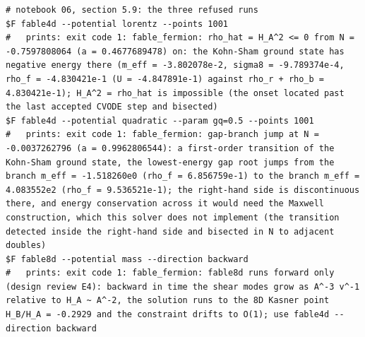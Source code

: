 \begin{Verbatim}[fontsize=\scriptsize]
# notebook 06, section 5.9: the three refused runs
$F fable4d --potential lorentz --points 1001
#   prints: exit code 1: fable_fermion: rho_hat = H_A^2 <= 0 from N = -0.7597808064 (a = 0.4677689478) on: the Kohn-Sham ground state has negative energy there (m_eff = -3.802078e-2, sigma8 = -9.789374e-4, rho_f = -4.830421e-1 (U = -4.847891e-1) against rho_r + rho_b = 4.830421e-1); H_A^2 = rho_hat is impossible (the onset located past the last accepted CVODE step and bisected)
$F fable4d --potential quadratic --param gq=0.5 --points 1001
#   prints: exit code 1: fable_fermion: gap-branch jump at N = -0.0037262796 (a = 0.9962806544): a first-order transition of the Kohn-Sham ground state, the lowest-energy gap root jumps from the branch m_eff = -1.518260e0 (rho_f = 6.856759e-1) to the branch m_eff = 4.083552e2 (rho_f = 9.536521e-1); the right-hand side is discontinuous there, and energy conservation across it would need the Maxwell construction, which this solver does not implement (the transition detected inside the right-hand side and bisected in N to adjacent doubles)
$F fable8d --potential mass --direction backward
#   prints: exit code 1: fable_fermion: fable8d runs forward only (design review E4): backward in time the shear modes grow as A^-3 v^-1 relative to H_A ~ A^-2, the solution runs to the 8D Kasner point H_B/H_A = -0.2929 and the constraint drifts to O(1); use fable4d --direction backward
\end{Verbatim}


